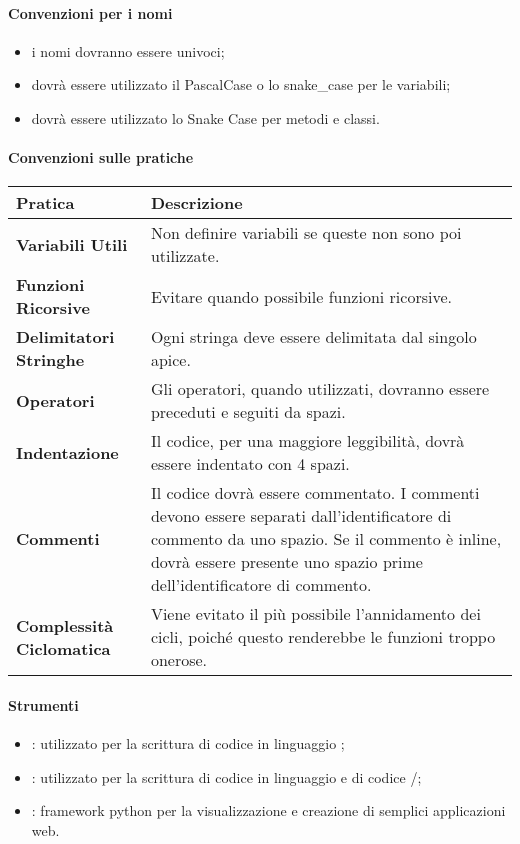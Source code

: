 		\paragraph{Convenzioni per i nomi} 
		\begin{itemize}
			\item i nomi dovranno essere univoci;
			\item dovrà essere utilizzato il PascalCase o lo snake\_case per le variabili;
			\item dovrà essere utilizzato lo Snake Case per metodi e classi. 
		\end{itemize}
			
		\paragraph{Convenzioni sulle pratiche} \hfill \break
    \newline
		\begin{tabular}{ |m{15em}|m{25em}| }
			\hline
		  \textbf{Pratica}			& \textbf{Descrizione}\\
			\hline
			\textbf{Variabili Utili}		& Non definire variabili se queste non sono poi utilizzate.\\
			\hline
			\textbf{Funzioni Ricorsive}		& Evitare quando possibile funzioni ricorsive.\\
			\hline
			\textbf{Delimitatori Stringhe}	& Ogni stringa deve essere delimitata dal singolo apice.\\
			\hline
			\textbf{Operatori}			& Gli operatori, quando utilizzati, dovranno essere preceduti e seguiti da spazi.\\
			\hline
			\textbf{Indentazione}			& Il codice, per una maggiore leggibilità, dovrà essere indentato con 4 spazi.\\ %
			\hline
			\textbf{Commenti}			& Il codice dovrà essere commentato. I commenti devono essere separati dall'identificatore di commento da uno spazio. Se il commento è inline, dovrà essere presente uno spazio prime dell'identificatore di commento.\\
			\hline
			\textbf{Complessità Ciclomatica}& Viene evitato il più possibile l'annidamento dei cicli, poiché questo renderebbe le funzioni troppo onerose.\\
			\hline
    \end{tabular}
		
		\paragraph{Strumenti} \hfill \break
		\begin{itemize}
      \item \textbf{}: utilizzato per la scrittura di codice in linguaggio ;
      \item \textbf{}: utilizzato per la scrittura di codice in linguaggio  e di codice /;
      \item \textbf{}: framework python per la visualizzazione e creazione di semplici applicazioni web.
    \end{itemize}

